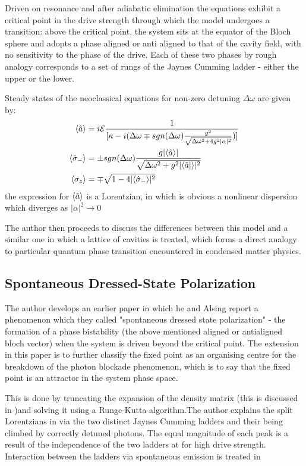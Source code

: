 Driven on resonance and after adiabatic elimination the equations exhibit a critical point in the drive strength through which the model undergoes a transition: above the critical point, the system sits at the equator of the Bloch sphere and adopts a phase aligned or anti aligned to that of the cavity field, with no sensitivity to the phase of the drive. Each of these two phases by rough analogy corresponds to a set of rungs of the Jaynes Cumming ladder - either the upper or the lower. 

Steady states of the neoclassical equations for non-zero detuning $\Delta \omega$ are given by:
\begin{align}
	\langle \hat{a} \rangle& = i \mathcal{E}\frac{1}{[\kappa-i(\Delta \omega \mp sgn(\Delta \omega) \frac{g^2}{\sqrt{\Delta \omega^2 +4g^2 |\alpha|^2}})]} \\
	\langle \hat{\sigma}_- \rangle& = \pm sgn(\Delta \omega) \frac{g |\langle \hat{a} \rangle|}{\sqrt{\Delta \omega^2 + g^2 |\langle \hat{a}| \rangle|^2}}\\
	\langle \sigma_z \rangle& = \mp \sqrt{1-4|\langle \hat{\sigma}_- \rangle|^2}
\end{align}
the expression for $\langle \hat{a} \rangle$ is a Lorentzian, in which is obvious a nonlinear dispersion which diverges as $|\alpha|^2 \rightarrow 0$

The author then proceeds to discuss the differences between this model and a similar one in which a lattice of cavities is treated, which forms a direct analogy to particular quantum phase transition encountered in condensed matter physics.

\subsection{Spontaneous Dressed-State Polarization}
The author develops an earlier paper \autocite{Alsing1999} in which he and Alsing report a phenomenon which they called "spontaneous dressed state polarization" - the formation of a phase bistability (the above mentioned aligned or antialigned bloch vector) when the system is driven beyond the critical point. The extension in this paper is to further classify the fixed point as an organising centre for the breakdown of the photon blockade phenomenon, which is to say that the fixed point is an attractor in the system phase space. 

This is done by truncating the expansion of the density matrix (this is discussed in \autocite{Savage1988})and solving it using a Runge-Kutta algorithm.The author explains the split Lorentzians in \autocite[Figure 1]{Carmichael2015} via the two distinct Jaynes Cumming ladders and their being climbed by correctly detuned photons. The equal magnitude of each peak is a result of the independence of the two ladders at for high drive strength. Interaction between the ladders via spontaneous emission is treated in \autocite[Section V]{Carmichael2015}


